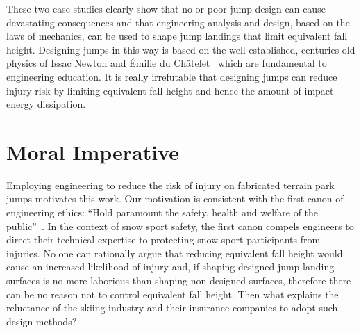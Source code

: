\documentclass[smallextended]{svjour3}       %
\begin{document}
%
These two case studies clearly show that no or poor jump
design can cause devastating consequences and that engineering analysis and design, based on the laws of mechanics, can be used to
shape jump landings that limit equivalent fall height. Designing jumps in this way
is based on the well-established, centuries-old physics of Issac Newton and Émilie du Châtelet~\cite{Zinsser2007} which are fundamental to engineering education. It is really irrefutable
that designing jumps can reduce injury risk by limiting equivalent fall height
and hence the amount of impact energy dissipation. 
%


\section{Moral Imperative}
\label{sec:moral}

%
Employing engineering to reduce the risk of injury on fabricated terrain
park jumps motivates this work. Our motivation is consistent with the first canon of engineering
ethics: ``Hold paramount the safety, health and welfare of the
public''~\cite{NSPE2019}. In the context of snow sport safety, the first canon
compels engineers to direct their technical expertise to protecting snow sport
participants from injuries. No one can rationally argue that reducing
equivalent fall height would cause an increased likelihood of injury and, if
shaping designed jump landing surfaces is no more laborious than shaping
non-designed surfaces, therefore there can be no reason not to control 
equivalent fall height. Then what explains the reluctance of the skiing
industry and their insurance companies to adopt such design methods?

\end{document}
